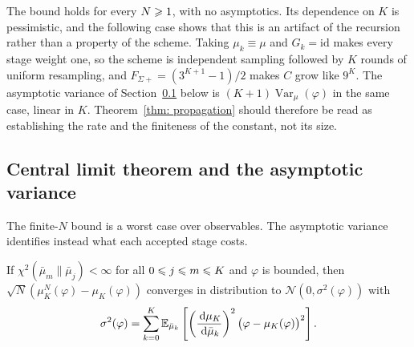 \documentclass{article}
\begin{document}
The bound holds for every $N\geqslant1$, with no asymptotics. Its dependence on $K$ is pessimistic, and the following case shows that this is an artifact of the recursion rather than a property of the scheme. Taking $\mu_k\equiv\mu$ and $G_k=\mathrm{id}$ makes every stage weight one, so the scheme is independent sampling followed by $K$ rounds of uniform resampling, and $F_{\Sigma+}=(3^{K+1}-1)/2$ makes $C$ grow like $9^{K}$. The asymptotic variance of Section~\ref{subsec: appendix-CLT} below is $(K+1)\operatorname{Var}_\mu(\varphi)$ in the same case, linear in $K$. Theorem~\ref{thm: propagation} should therefore be read as establishing the rate and the finiteness of the constant, not its size.

\subsection{Central limit theorem and the asymptotic variance}
\label{subsec: appendix-CLT}

The finite-$N$ bound is a worst case over observables. The asymptotic variance identifies instead what each accepted stage costs.

\begin{theorem}
\label{thm: appendix-CLT}
If $\chi^2(\bar\mu_m\|\bar\mu_j)<\infty$ for all $0\leqslant j\leqslant m\leqslant K$ and $\varphi$ is bounded, then $\sqrt N(\mu_K^N(\varphi)-\mu_K(\varphi))$ converges in distribution to $\mathcal N(0,\sigma^2(\varphi))$ with
\begin{equation}
    \sigma^2(\varphi) = \sum_{k=0}^{K}\mathbb E_{\bar\mu_k}
    \left[\left(\frac{\,\mathrm d\mu_K}{\,\mathrm d\bar\mu_k}\right)^{2}\bigl(\varphi-\mu_K(\varphi)\bigr)^{2}\right].
    \label{eq: appendix-CLT}
\end{equation}
\end{theorem}
\end{document}

